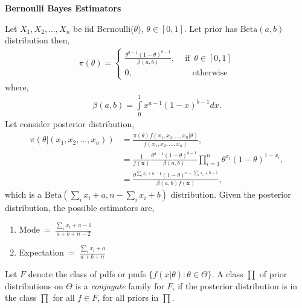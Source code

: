 \begin{exmp}\textbf{Bernoulli Bayes Estimators}
\par Let $X_1,X_2,\dots,X_n$ be iid Bernoulli($\theta$), $\theta \in [0,1]$. Let prior has $\mathrm{Beta}(a,b)$ distribution then,
\begin{align}
\pi(\theta) = 
\begin{cases}
 \displaystyle{\frac{\theta^{a-1}(1-\theta)^{b-1}}{\beta(a,b)}},       \,\,\,\,\,\,\,\mbox{if}\,\,\,\theta \in [0,1] \\
0,\hspace{85pt}\mbox{otherwise}
\end{cases}
\end{align} 
where,
\begin{align}
\beta(a,b) = \displaystyle{\int\limits_0^1 x^{a-1}(1-x)^{b-1}dx}.
\end{align}
Let consider posterior distribution,
\begin{align}
\pi(\theta|(x_1,x_2,\dots,x_n))&=\displaystyle{\frac{\pi(\theta)f(x_1,x_2,\dots,x_n|\theta)}{f(x_1,x_2,\dots,x_n)}},\\
&=\displaystyle{ \frac{1}{f(\textbf{x})} \frac{\theta^{a-1}(1-\theta)^{b-1}}{\beta(a,b)} \prod\limits_{i=1}^n{\theta^{x_i}(1-\theta)^{1-x_i}}},\nonumber\\
&=\displaystyle{\frac{\theta^{\sum\limits_i {x_i}+a-1}(1-\theta)^{n-\sum\limits_i x_i +b-1}}{\beta(a,b)f(\textbf{x})}},\nonumber
\end{align}
which is a $\mathrm{Beta}\left(\sum\limits_i {x_i}+a,n-\sum\limits_i x_i +b\right)$ distribution.  
Given the posterior distribution, the possible estimators are,
\begin{enumerate}
\item Mode\,\,\,=\,\,\,$\displaystyle{\frac{\sum\limits_i {x_i}+a-1}{a+b+n-2}}$
\item Expectation\,\,\,=\,\,\,$\displaystyle{\frac{\sum\limits_i {x_i}+a}{a+b+n}}$
\end{enumerate}
\end{exmp}
\begin{defn}{Let $F$ denote the class of pdfs or pmfs $\{f(x|\theta):\theta \in \Theta\}$. A class $\prod$ of prior distributions on $\Theta$ is a \textit{conjugate} family for $F$, if the posterior distribution is in the class $\prod$ for all $f \in F$, for all priors in $\prod$.}
\end{defn}
